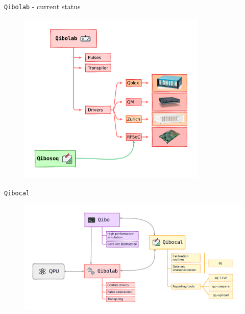 \documentclass[8pt, xcolor={svgnames}, hyperref={linkcolor=black}]{beamer}
\begin{document}
\begin{frame}{\texttt{Qibolab} - current status}
\begin{figure}  
   \includegraphics[width=0.8\textwidth]{figures/Instruments.pdf}
\end{figure}
\end{frame}

\begin{frame}{\texttt{Qibocal}}
\begin{figure}  
   \includegraphics[width=1\textwidth]{figures/qibocal.pdf}
\end{figure}
\end{frame}
\end{document}
